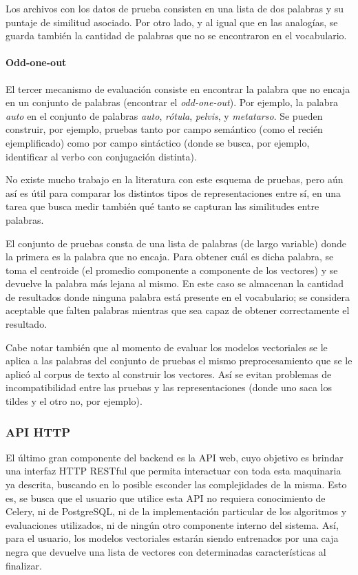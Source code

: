 Los archivos con los datos de prueba consisten en una lista de dos palabras y su puntaje de
similitud asociado. Por otro lado, y al igual que en las analogías, se guarda también la cantidad de
palabras que no se encontraron en el vocabulario.


\paragraph{Odd-one-out}

El tercer mecanismo de evaluación consiste en encontrar la palabra que no encaja en un conjunto de
palabras (encontrar el \textit{odd-one-out}). Por ejemplo, la palabra \textit{auto} en el conjunto
de palabras \textit{auto}, \textit{rótula}, \textit{pelvis}, y \textit{metatarso}. Se pueden
construir, por ejemplo, pruebas tanto por campo semántico (como el recién ejemplificado) como por
campo sintáctico (donde se busca, por ejemplo, identificar al verbo con conjugación distinta).

No existe mucho trabajo en la literatura con este esquema de pruebas, pero aún así es útil para
comparar los distintos tipos de representaciones entre sí, en una tarea que busca medir también qué
tanto se capturan las similitudes entre palabras.

El conjunto de pruebas consta de una lista de palabras (de largo variable) donde la primera es la
palabra que no encaja. Para obtener cuál es dicha palabra, se toma el centroide (el promedio
componente a componente de los vectores) y se devuelve la palabra más lejana al mismo. En este caso
se almacenan la cantidad de resultados donde ninguna palabra está presente en el vocabulario; se
considera aceptable que falten palabras mientras que sea capaz de obtener correctamente el
resultado.

\quad

Cabe notar también que al momento de evaluar los modelos vectoriales se le aplica a las palabras del
conjunto de pruebas el mismo preprocesamiento que se le aplicó al corpus de texto al construir los
vectores. Así se evitan problemas de incompatibilidad entre las pruebas y las representaciones
(donde uno saca los tildes y el otro no, por ejemplo).


\subsubsection{API HTTP}

El último gran componente del backend es la API web, cuyo objetivo es brindar una interfaz HTTP
RESTful que permita interactuar con toda esta maquinaria ya descrita, buscando en lo posible
esconder las complejidades de la misma. Esto es, se busca que el usuario que utilice esta API no
requiera conocimiento de Celery, ni de PostgreSQL, ni de la implementación particular de los
algoritmos y evaluaciones utilizados, ni de ningún otro componente interno del sistema. Así, para el
usuario, los modelos vectoriales estarán siendo entrenados por una caja negra que devuelve una lista
de vectores con determinadas características al finalizar.

